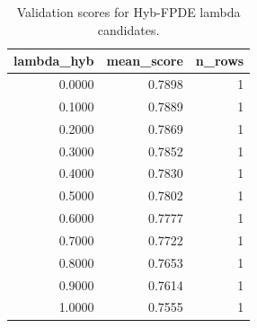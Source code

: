 \begin{table}[t]
\caption{Validation scores for Hyb-FPDE lambda candidates.}
\label{tab:lambda_distribution_computed}
\centering
\begin{tabular}{rrr}
\toprule
lambda\_hyb & mean\_score & n\_rows \\
\midrule
0.0000 & 0.7898 & 1 \\
0.1000 & 0.7889 & 1 \\
0.2000 & 0.7869 & 1 \\
0.3000 & 0.7852 & 1 \\
0.4000 & 0.7830 & 1 \\
0.5000 & 0.7802 & 1 \\
0.6000 & 0.7777 & 1 \\
0.7000 & 0.7722 & 1 \\
0.8000 & 0.7653 & 1 \\
0.9000 & 0.7614 & 1 \\
1.0000 & 0.7555 & 1 \\
\bottomrule
\end{tabular}

\end{table}
